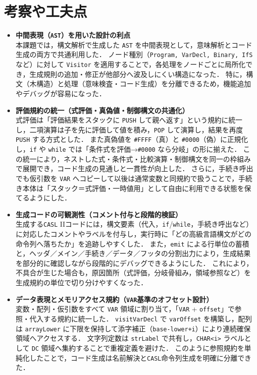 \documentclass[a4j,10pt]{jarticle}
\begin{document}
\section{考察や工夫点}
\begin{itemize}
  \item \textbf{中間表現（\texttt{AST}）を用いた設計の利点}\\
  本課題では，構文解析で生成した \verb|AST| を中間表現として，意味解析とコード生成の両方で共通利用した．
  ノード種別（\verb|Program, VarDecl, Binary, IfS| など）に対して \verb|Visitor| を適用することで，各処理をノードごとに局所化でき，生成規則の追加・修正が他部分へ波及しにくい構造になった．
  特に，構文（木構造）と処理（意味検査・コード生成）を分離できるため，機能追加やデバッグが容易になった．

  \item \textbf{評価規約の統一（式評価・真偽値・制御構文の共通化）}\\
  式評価は「評価結果をスタックに \verb|PUSH| して親へ返す」という規約に統一し，二項演算は子を先に評価して値を積み，\verb|POP| して演算し，結果を再度 \verb|PUSH| する方式とした．
  また真偽値を \verb|#FFFF|（真）と \verb|#0000|（偽）に正規化し，\verb|if| や \verb|while| では「条件式を評価→\verb|#0000| なら分岐」の形に揃えた．
  この統一により，ネストした式・条件式・比較演算・制御構文を同一の枠組みで展開でき，コード生成の見通しと一貫性が向上した．
  さらに，手続き呼出でも仮引数を \texttt{VAR} へコピーして以後は通常変数と同規約で扱うことで，手続き本体は「スタック＝式評価・一時値用」として自由に利用できる状態を保てるようにした．

  \item \textbf{生成コードの可観測性（コメント付与と段階的検証）}\\
  生成する\verb|CASL| IIコードには，構文要素（代入，\texttt{if}/\texttt{while}，手続き呼出など）に対応したコメントやラベルを付与し，実行時に「どの高級言語構文がどの命令列へ落ちたか」を追跡しやすくした．
  また，\verb|emit| による行単位の蓄積と，ヘッダ／メイン／手続き／データ／フッタの分割出力により，生成結果を部分的に確認しながら段階的にデバッグできるようにした．
  これにより，不具合が生じた場合も，原因箇所（式評価，分岐骨組み，領域参照など）を生成規約の単位で切り分けやすくなった．

  \item \textbf{データ表現とメモリアクセス規約（\texttt{VAR}基準のオフセット設計）}\\
  変数・配列・仮引数をすべて \texttt{VAR} 領域に割り当て，「\texttt{VAR} + \verb|offset|」で参照・代入する規約に統一した．
  \verb|visitVarDecl| で \verb|varOffset| を構築し，配列は \verb|arrayLower| に下限を保持して添字補正（\texttt{base-lower+i}）により連続確保領域へアクセスする．
  文字列定数は \verb|strLabel| で共有し，\texttt{CHAR<i>} ラベルとして \texttt{DC} 領域へ集約することで重複定義を避けた．
  このように参照規約を単純化したことで，コード生成は名前解決と\verb|CASL|命令列生成を明確に分離できた．


\end{itemize}
\end{document}
